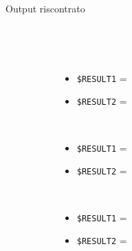 \documentclass[../../SperimentazioniPratiche.tex]{subfiles}
\begin{document}
\begin{tcolorbox}[fonttitle=\bfseries, 
								adjusted title={\Large Prova 1C.2}, 
								breakable, 
								sharp corners=south,
								colback=white, 
								colframe=white!60!black]
\begin{description}
        			\item[Output riscontrato] \ \par
        				\begin{description}
        				
        					\item[\dispositivoA] \ \par
        					\begin{itemize}
        						\item \verb|$RESULT1| = \ok
        						\item \verb|$RESULT2| = \ok
        					\end{itemize}      					
        					
        					\item[\dispositivoB] \ \par
        					\begin{itemize}
        						\item \verb|$RESULT1| = \ok
        						\item \verb|$RESULT2| = \ok
        					\end{itemize}
        					
        					\item[\dispositivoC] \ \par
        					\begin{itemize}
        						\item \verb|$RESULT1| = \ok
        						\item \verb|$RESULT2| = \ok
        					\end{itemize}
        					
        				\end{description}
        				
				\end{description}  
				
			\end{tcolorbox}

	\newpage
\end{document}
